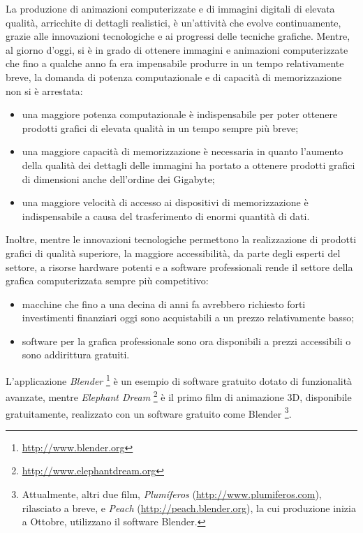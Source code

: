 La produzione di animazioni computerizzate e di immagini digitali di elevata qualit\`a, arricchite di dettagli realistici, \`e un'attivit\`a che evolve continuamente, grazie alle innovazioni tecnologiche e ai progressi delle tecniche grafiche.
Mentre, al giorno d'oggi, si \`e in grado di ottenere immagini e animazioni computerizzate che fino a qualche anno fa era impensabile produrre in un tempo relativamente breve, la domanda di potenza computazionale e di capacit\`a di memorizzazione non si \`e arrestata:
\begin{itemize}
\item una maggiore potenza computazionale \`e indispensabile per poter ottenere prodotti grafici di elevata qualit\`a in un tempo sempre pi\`u breve;
\item una maggiore capacit\`a di memorizzazione \`e necessaria in quanto l'aumento della qualit\`a dei dettagli delle immagini ha portato a ottenere prodotti grafici di dimensioni anche dell'ordine dei Gigabyte;
\item una maggiore velocit\`a di accesso ai dispositivi di memorizzazione \`e indispensabile a causa del trasferimento di enormi quantit\`a di dati.
\end{itemize}
Inoltre, mentre le innovazioni tecnologiche permettono la realizzazione di prodotti grafici di qualit\`a superiore, la maggiore accessibilit\`a, da parte degli esperti del settore, a risorse hardware potenti e a software professionali rende il settore della grafica computerizzata sempre pi\`u competitivo:
\begin{itemize}
\item macchine che fino a una decina di anni fa avrebbero richiesto forti investimenti finanziari oggi sono acquistabili a un prezzo relativamente basso;
\item software per la grafica professionale sono ora disponibili a prezzi accessibili o sono addirittura gratuiti.
\end{itemize}
L'applicazione \emph{Blender} \footnote{\href{http://www.blender.org}{http://www.blender.org}} \`e un esempio di software gratuito dotato di funzionalit\`a avanzate, mentre \emph{Elephant Dream} \footnote{\href{http://www.elephantdream.org}{http://www.elephantdream.org}} \`e il primo film di animazione 3D, disponibile gratuitamente, realizzato con un software gratuito come Blender \footnote{Attualmente, altri due film, \emph{Plum\'iferos} (\href{http://www.plumiferos.com}{http://www.plumiferos.com}), rilasciato a breve, e \emph{Peach} (\href{http://peach.blender.org}{http://peach.blender.org}), la cui produzione inizia a Ottobre, utilizzano il software Blender.}.


